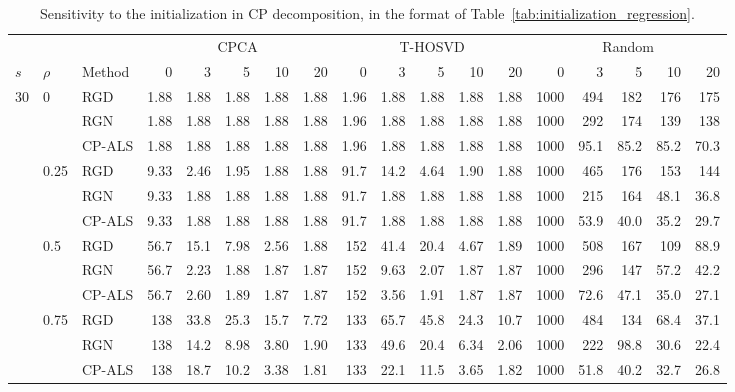 \begin{table}[!htbp]
\centering
\caption{Sensitivity to the initialization in CP decomposition, in the format of Table~\ref{tab:initialization_regression}.}
\label{tab:initialization_decomposition}
{\small\setlength{\tabcolsep}{2.5pt}
\begin{tabular}{lll*{15}{r}}
\toprule
 & & & \multicolumn{5}{c}{CPCA} & \multicolumn{5}{c}{T-HOSVD} & \multicolumn{5}{c}{Random} \\
\cmidrule(lr){4-8}\cmidrule(lr){9-13}\cmidrule(l){14-18}
$s$ & $\rho$ & Method & 0 & 3 & 5 & 10 & 20 & 0 & 3 & 5 & 10 & 20 & 0 & 3 & 5 & 10 & 20 \\
\midrule
30 & 0 & RGD & 1.88 & 1.88 & 1.88 & 1.88 & 1.88 & 1.96 & 1.88 & 1.88 & 1.88 & 1.88 & 1000 & 494 & 182 & 176 & 175 \\
 &  & RGN & 1.88 & 1.88 & 1.88 & 1.88 & 1.88 & 1.96 & 1.88 & 1.88 & 1.88 & 1.88 & 1000 & 292 & 174 & 139 & 138 \\
 &  & CP-ALS & 1.88 & 1.88 & 1.88 & 1.88 & 1.88 & 1.96 & 1.88 & 1.88 & 1.88 & 1.88 & 1000 & 95.1 & 85.2 & 85.2 & 70.3 \\
\addlinespace
 & 0.25 & RGD & 9.33 & 2.46 & 1.95 & 1.88 & 1.88 & 91.7 & 14.2 & 4.64 & 1.90 & 1.88 & 1000 & 465 & 176 & 153 & 144 \\
 &  & RGN & 9.33 & 1.88 & 1.88 & 1.88 & 1.88 & 91.7 & 1.88 & 1.88 & 1.88 & 1.88 & 1000 & 215 & 164 & 48.1 & 36.8 \\
 &  & CP-ALS & 9.33 & 1.88 & 1.88 & 1.88 & 1.88 & 91.7 & 1.88 & 1.88 & 1.88 & 1.88 & 1000 & 53.9 & 40.0 & 35.2 & 29.7 \\
\addlinespace
 & 0.5 & RGD & 56.7 & 15.1 & 7.98 & 2.56 & 1.88 & 152 & 41.4 & 20.4 & 4.67 & 1.89 & 1000 & 508 & 167 & 109 & 88.9 \\
 &  & RGN & 56.7 & 2.23 & 1.88 & 1.87 & 1.87 & 152 & 9.63 & 2.07 & 1.87 & 1.87 & 1000 & 296 & 147 & 57.2 & 42.2 \\
 &  & CP-ALS & 56.7 & 2.60 & 1.89 & 1.87 & 1.87 & 152 & 3.56 & 1.91 & 1.87 & 1.87 & 1000 & 72.6 & 47.1 & 35.0 & 27.1 \\
\addlinespace
 & 0.75 & RGD & 138 & 33.8 & 25.3 & 15.7 & 7.72 & 133 & 65.7 & 45.8 & 24.3 & 10.7 & 1000 & 484 & 134 & 68.4 & 37.1 \\
 &  & RGN & 138 & 14.2 & 8.98 & 3.80 & 1.90 & 133 & 49.6 & 20.4 & 6.34 & 2.06 & 1000 & 222 & 98.8 & 30.6 & 22.4 \\
 &  & CP-ALS & 138 & 18.7 & 10.2 & 3.38 & 1.81 & 133 & 22.1 & 11.5 & 3.65 & 1.82 & 1000 & 51.8 & 40.2 & 32.7 & 26.8 \\

\end{tabular}}
\end{table}
